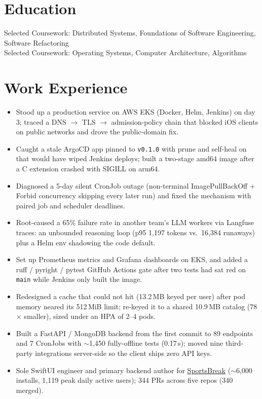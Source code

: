 \documentclass[11pt, letterpaper]{article}
\begin{document}

\section{Education}
Selected Coursework: Distributed Systems, Foundations of Software Engineering, Software Refactoring\\[1pt]
Selected Coursework: Operating Systems, Computer Architecture, Algorithms

\section{Work Experience}
\begin{itemize}
  \item Stood up a production service on AWS EKS (Docker, Helm, Jenkins) on day 3; traced a DNS $\to$ TLS $\to$ admission-policy chain that blocked iOS clients on public networks and drove the public-domain fix.
  \item Caught a stale ArgoCD app pinned to \texttt{v0.1.0} with prune and self-heal on that would have wiped Jenkins deploys; built a two-stage amd64 image after a C extension crashed with SIGILL on arm64.
  \item Diagnosed a 5-day silent CronJob outage (non-terminal ImagePullBackOff + Forbid concurrency skipping every later run) and fixed the mechanism with paired job and scheduler deadlines.
  \item Root-caused a 65\% failure rate in another team's LLM workers via Langfuse traces: an unbounded reasoning loop (p95 1{,}197 tokens vs.\ 16{,}384 runaways) plus a Helm env shadowing the code default.
  \item Set up Prometheus metrics and Grafana dashboards on EKS, and added a ruff / pyright / pytest GitHub Actions gate after two tests had sat red on \texttt{main} while Jenkins only built the image.
  \item Redesigned a cache that could not hit (13.2\,MB keyed per user) after pod memory neared its 512\,MiB limit; re-keyed it to a shared 10.9\,MB catalog (78$\times$ smaller), sized under an HPA of 2--4 pods.
  \item Built a FastAPI / MongoDB backend from the first commit to 89 endpoints and 7 CronJobs with $\sim$1{,}450 fully-offline tests (0.17\,s); moved nine third-party integrations server-side so the client ships zero API keys.
  \item Sole SwiftUI engineer and primary backend author for \href{https://apps.apple.com/app/id6762649287}{SportsBreak} ($\sim$6{,}000 installs, 1{,}119 peak daily active users); 344 PRs across five repos (340 merged).
\end{itemize}
\end{document}
